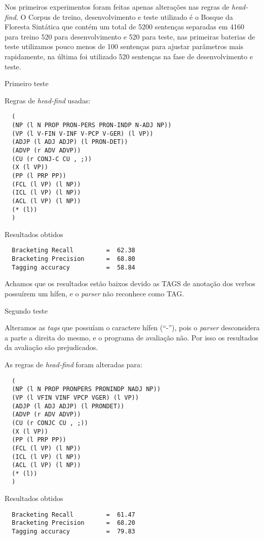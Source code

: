 Nos primeiros experimentos foram feitas apenas alterações nas regras de \emph{head-find}. O Corpus de treino, desenvolvimento e teste utilizado é o Bosque da Floresta Sintática que contém um total de 5200 sentenças separadas em 4160 para treino 520 para desenvolvimento e 520 para teste, nas primeiras baterias de teste utilizamos pouco menos de 100 sentenças para ajustar parâmetros mais rapidamente, na última foi utilizado 520 sentenças na fase de desenvolvimento e teste.

Primeiro teste

Regras de \emph{head-find} usadas:

\scriptsize
\begin{verbatim}
  (
  (NP (l N PROP PRON-PERS PRON-INDP N-ADJ NP))
  (VP (l V-FIN V-INF V-PCP V-GER) (l VP))
  (ADJP (l ADJ ADJP) (l PRON-DET))
  (ADVP (r ADV ADVP))
  (CU (r CONJ-C CU , ;))
  (X (l VP))
  (PP (l PRP PP))
  (FCL (l VP) (l NP))
  (ICL (l VP) (l NP))
  (ACL (l VP) (l NP))
  (* (l))
  )
\end{verbatim}

Resultados obtidos

\begin{verbatim}
  Bracketing Recall         =  62.38
  Bracketing Precision      =  68.80
  Tagging accuracy          =  58.84
\end{verbatim}

\normalsize
Achamos que os resultados estão baixos devido as TAGS de anotação dos verbos possuírem um hífen, e o \emph{parser} não reconhece como TAG.

Segundo teste

Alteramos as \emph{tags} que possuíam o caractere hífen (``-''), pois o \emph{parser} desconsidera a parte a direita do mesmo, e o programa de avaliação não. Por isso os resultados da avaliação são prejudicados.

As regras de \emph{head-find} foram alteradas para:

\scriptsize
\begin{verbatim}
  (
  (NP (l N PROP PRONPERS PRONINDP NADJ NP))
  (VP (l VFIN VINF VPCP VGER) (l VP))
  (ADJP (l ADJ ADJP) (l PRONDET))
  (ADVP (r ADV ADVP))
  (CU (r CONJC CU , ;))
  (X (l VP))
  (PP (l PRP PP))
  (FCL (l VP) (l NP))
  (ICL (l VP) (l NP))
  (ACL (l VP) (l NP))
  (* (l))
  )
\end{verbatim}

Resultados obtidos

\begin{verbatim}
  Bracketing Recall         =  61.47
  Bracketing Precision      =  68.20
  Tagging accuracy          =  79.83
\end{verbatim}

